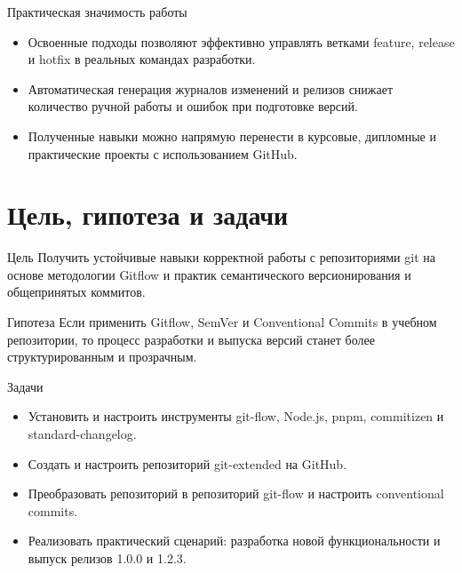 \documentclass[
  ignorenonframetext,
  aspectratio=169,
  russian,
  aspectratio=169]{beamer}
\providecommand{\tightlist}{%
  \setlength{\itemsep}{0pt}\setlength{\parskip}{0pt}}
\begin{document}
\begin{frame}{Практическая значимость работы}
\label{ux43fux440ux430ux43aux442ux438ux447ux435ux441ux43aux430ux44f-ux437ux43dux430ux447ux438ux43cux43eux441ux442ux44c-ux440ux430ux431ux43eux442ux44b}
\begin{itemize}[<+->]
\tightlist
\item
  Освоенные подходы позволяют эффективно управлять ветками feature,
  release и hotfix в реальных командах разработки.
\item
  Автоматическая генерация журналов изменений и релизов снижает
  количество ручной работы и ошибок при подготовке версий.
\item
  Полученные навыки можно напрямую перенести в курсовые, дипломные и
  практические проекты с использованием GitHub.
\end{itemize}
\end{frame}

\section{Цель, гипотеза и
задачи}\label{ux446ux435ux43bux44c-ux433ux438ux43fux43eux442ux435ux437ux430-ux438-ux437ux430ux434ux430ux447ux438}

\begin{frame}{Цель}
\label{ux446ux435ux43bux44c}
Получить устойчивые навыки корректной работы с репозиториями git на
основе методологии Gitflow и практик семантического версионирования и
общепринятых коммитов.
\end{frame}

\begin{frame}{Гипотеза}
\label{ux433ux438ux43fux43eux442ux435ux437ux430}
Если применить Gitflow, SemVer и Conventional Commits в учебном
репозитории, то процесс разработки и выпуска версий станет более
структурированным и прозрачным.
\end{frame}

\begin{frame}{Задачи}
\label{ux437ux430ux434ux430ux447ux438}
\begin{itemize}[<+->]
\tightlist
\item
  Установить и настроить инструменты git-flow, Node.js, pnpm, commitizen
  и standard-changelog.
\item
  Создать и настроить репозиторий git-extended на GitHub.
\item
  Преобразовать репозиторий в репозиторий git-flow и настроить
  conventional commits.
\item
  Реализовать практический сценарий: разработка новой функциональности и
  выпуск релизов 1.0.0 и 1.2.3.
\end{itemize}
\end{frame}
\end{document}
